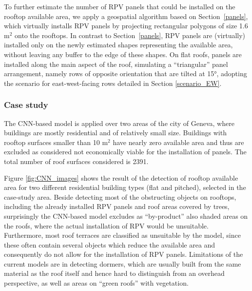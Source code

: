 To further estimate the number of RPV panels that could be installed on the rooftop available area, we apply a geospatial algorithm based on Section~\ref{panels}, which virtually installs RPV panels by projecting rectangular polygons of size 1.6 m$^2$ onto the rooftops. In contrast to Section~\ref{panels}, RPV panels are (virtually) installed only on the newly estimated shapes representing the available area, without leaving any buffer to the edge of these shapes. On flat roofs, panels are installed along the main aspect of the roof, simulating a “triangular” panel arrangement, namely rows of opposite orientation that are tilted at 15°, adopting the scenario for east-west-facing rows detailed in Section \ref{scenario_EW}.

\subsubsection{Case study}

The CNN-based model is applied over two areas of the city of Geneva, where buildings are mostly residential and of relatively small size. Buildings with rooftop surfaces smaller than 10 m$^2$ have nearly zero available area and thus are excluded as considered not economically viable for the installation of panels. The total number of roof surfaces considered is 2391.

Figure \ref{fig:CNN_images} shows the result of the detection of rooftop available area for two different residential building types (flat and pitched), selected in the case-study area. Beside detecting most of the obstructing objects on rooftops, including the already installed RPV panels and roof areas covered by trees, surprisingly the CNN-based model excludes as “by-product” also shaded areas on the roofs, where the actual installation of RPV would be unsuitable. Furthermore, most roof terraces are classified as unsuitable by the model, since these often contain several objects which reduce the available area and consequently do not allow for the installation of RPV panels. Limitations of the current models are in detecting dormers, which are usually built from the same material as the roof itself and hence hard to distinguish from an overhead perspective, as well as areas on “green roofs” with vegetation.

